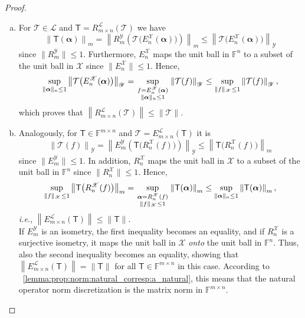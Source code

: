 \documentclass[a4paper]{paper}
\newcommand{\Spc}[1]{\mathscr{#1}}
\newcommand{\Field}{\mathbb{F}}
\newcommand{\Op}[1]{\mathcal{#1}}
\newcommand{\DiscOp}[1]{\mathsf{#1}}
\newcommand*{\EXT}[2]{\ensuremath{E_{#1}^{#2}}}
\newcommand*{\REST}[2]{\ensuremath{R_{#1}^{#2}}}
\newcommand*{\RnX}{\ensuremath{\REST{n}{\Spc{X}}}}
\newcommand*{\RmY}{\ensuremath{\REST{m}{\Spc{Y}}}}
\newcommand*{\EnX}{\ensuremath{\EXT{n}{\Spc{X}}}}
\newcommand*{\EmY}{\ensuremath{\EXT{m}{\Spc{Y}}}}
\newcommand*{\STACK}[2]{\genfrac{}{}{0pt}{1}{#1}{#2}}
\newcommand{\ie}{\textsl{i.e.}\xspace}
\newcommand{\valpha}{\boldsymbol{\alpha}}
\newcommand*{\NORMLR}[1]{\ensuremath{\left\lVert #1 \right\rVert}}
\newcommand*{\NORM}[1]{\ensuremath{\lVert #1 \rVert}}
\begin{document}
\begin{proof}
 \begin{enumerate}[(a)]
  \item For $\Op{T} \in \Spc{L}$ and $\DiscOp{T} = \REST{m\times n}{\Spc{L}}(\Op{T})$ we have
  \begin{equation*}
   \NORMLR{\DiscOp{T}(\valpha)}_m = \NORMLR{\RmY \left( \Op{T}\big( \EnX(\valpha) \big) \right)}_m
   \leq \NORMLR{\Op{T}\big( \EnX(\valpha) \big)}_{\Spc{Y}}
  \end{equation*}
  since $\NORM{\RmY} \leq 1$. Furthermore, $\EnX$ maps the unit ball in $\Field^n$ to a subset of the unit ball in
  $\Spc{X}$ since $\NORM{\EnX} \leq 1$. Hence,
  \begin{equation*}
   \sup_{\NORM{\valpha}_n \leq 1} \NORMLR{\Op{T}\big( \EnX(\valpha) \big)}_{\Spc{Y}}
   = \sup_{\STACK{f=\EnX(\valpha)}{\NORM{\valpha}_n \leq 1}} \NORMLR{\Op{T}(f)}_{\Spc{Y}}
   \leq \sup_{\NORM{f}_{\Spc{X}} \leq 1} \NORMLR{\Op{T}(f)}_{\Spc{Y}},
  \end{equation*}
  which proves that $\NORMLR{\REST{m\times n}{\Spc{L}}(\Op{T})} \leq \NORM{\Op{T}}$.

  \item Analogously, for $\DiscOp{T} \in \Field^{m\times n}$ and $\Op{T} = \EXT{m\times n}{\Spc{L}}(\DiscOp{T})$ it is
  \begin{equation*}
   \NORMLR{\Op{T}(f)}_{\Spc{Y}} = \NORMLR{\EmY \left( \DiscOp{T}\big( \RnX(f) \big) \right)}_{\Spc{Y}}
   \leq \NORMLR{\DiscOp{T}\big( \RnX(f) \big)}_m
  \end{equation*}
  since $\NORM{\EmY} \leq 1$. In addition, $\RnX$ maps the unit ball in $\Spc{X}$ to a subset of the unit 
  ball in $\Field^n$ since $\NORM{\RnX} \leq 1$. Hence,
  \begin{equation*}
   \sup_{\NORM{f}_{\Spc{X}} \leq 1} \NORMLR{\DiscOp{T}\big( \RnX(f) \big)}_m
   = \sup_{\STACK{\valpha=\RnX(f)}{\NORM{f}_{\Spc{X}} \leq 1}} \NORMLR{\DiscOp{T}(\valpha)}_m
   \leq \sup_{\NORM{\valpha}_n \leq 1} \NORMLR{\DiscOp{T}(\valpha)}_m,
  \end{equation*}
  \ie, $\NORMLR{E_{m\times n}^{\Spc{L}}(\DiscOp{T})} \leq \NORM{\DiscOp{T}}$.\\[1em]
  If $\EmY$ is an isometry, the first inequality becomes an equality, and if $\RnX$ is a surjective isometry, it maps
  the unit ball in $\Spc{X}$ \emph{onto} the unit ball in $\Field^n$. Thus, also the second inequality becomes an 
  equality, showing that $\NORMLR{\EXT{m\times n}{\Spc{L}}(\DiscOp{T})} = \NORM{\DiscOp{T}}$ for all 
  $\DiscOp{T} \in \Field^{m\times n}$ in this case. According to 
  ~\eqref{lemma:prop:norm:natural_corresp:a_natural}, this means that the natural 
  operator norm discretization is the matrix norm in $\Field^{m\times n}$.
 \end{enumerate}
\end{proof}
\end{document}
